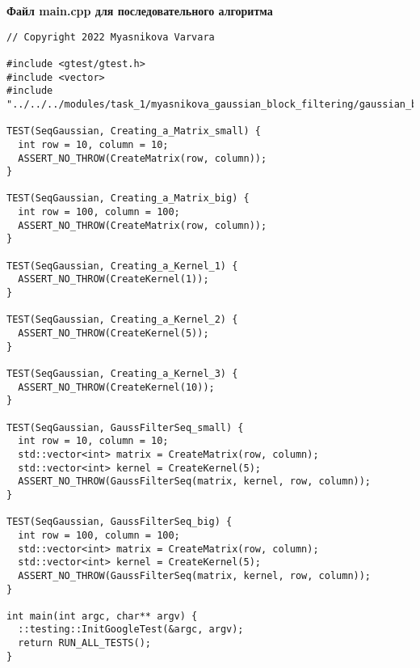 \documentclass{report}
\begin{document}
\newpage
\textbf{ Файл main.cpp для последовательного алгоритма }
\begin{lstlisting}
// Copyright 2022 Myasnikova Varvara

#include <gtest/gtest.h>
#include <vector>
#include "../../../modules/task_1/myasnikova_gaussian_block_filtering/gaussian_block_filtering.h"

TEST(SeqGaussian, Creating_a_Matrix_small) {
  int row = 10, column = 10;
  ASSERT_NO_THROW(CreateMatrix(row, column));
}

TEST(SeqGaussian, Creating_a_Matrix_big) {
  int row = 100, column = 100;
  ASSERT_NO_THROW(CreateMatrix(row, column));
}

TEST(SeqGaussian, Creating_a_Kernel_1) {
  ASSERT_NO_THROW(CreateKernel(1));
}

TEST(SeqGaussian, Creating_a_Kernel_2) {
  ASSERT_NO_THROW(CreateKernel(5));
}

TEST(SeqGaussian, Creating_a_Kernel_3) {
  ASSERT_NO_THROW(CreateKernel(10));
}

TEST(SeqGaussian, GaussFilterSeq_small) {
  int row = 10, column = 10;
  std::vector<int> matrix = CreateMatrix(row, column);
  std::vector<int> kernel = CreateKernel(5);
  ASSERT_NO_THROW(GaussFilterSeq(matrix, kernel, row, column));
}

TEST(SeqGaussian, GaussFilterSeq_big) {
  int row = 100, column = 100;
  std::vector<int> matrix = CreateMatrix(row, column);
  std::vector<int> kernel = CreateKernel(5);
  ASSERT_NO_THROW(GaussFilterSeq(matrix, kernel, row, column));
}

int main(int argc, char** argv) {
  ::testing::InitGoogleTest(&argc, argv);
  return RUN_ALL_TESTS();
}

\end{lstlisting}
\newpage
\end{document}
